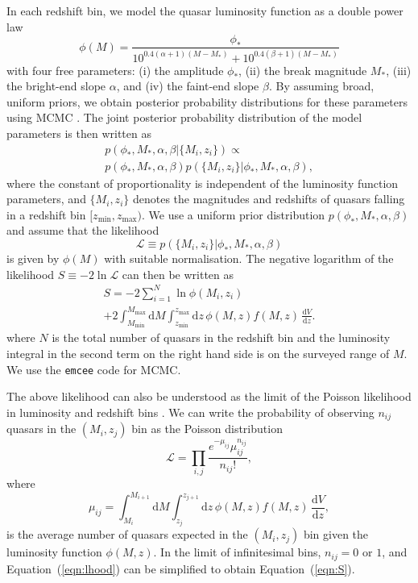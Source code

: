 \documentclass[fleqn,usenatbib]{mnras}
\begin{document}
In each redshift bin, we model the quasar
luminosity function as a double power law 
\citep[e.g.][]{1988MNRAS.235..935B}
\begin{equation}
  \phi(M) =
  \frac{\phi_*}{10^{0.4(\alpha+1)(M-M_*)}+10^{0.4(\beta+1)(M-M_*)}}
  \label{eqn:dpl}
\end{equation}
with four free parameters: (i) the amplitude $\phi_*$, (ii) the break magnitude $M_*$,
(iii)  the bright-end slope $\alpha$, and (iv) the faint-end slope $\beta$.
By assuming broad, uniform priors, we
obtain posterior probability distributions for these parameters using
MCMC \citep[e.g.,][]{jaynes}.  The joint posterior probability
distribution of the model parameters is then written as
\begin{multline}
  p(\phi_*, M_*, \alpha, \beta | \{M_i, z_i\}) \propto \\ p(\phi_*, M_*,
  \alpha, \beta)p(\{M_i, z_i\} | \phi_*, M_*, \alpha, \beta),
\end{multline}
where the constant of proportionality is independent of the luminosity
function parameters, and $\{M_i, z_i\}$ denotes the magnitudes and
redshifts of quasars falling in a redshift bin $[z_\mathrm{min},
z_\mathrm{max})$.  We use a uniform prior distribution $p(\phi_*,
M_*, \alpha, \beta)$ and assume that the likelihood
\begin{equation}
  \mathcal{L}\equiv p(\{M_i, z_i\} | \phi_*, M_*, \alpha, \beta)
\end{equation}
is given by $\phi(M)$ with suitable normalisation.  The negative
logarithm of the likelihood $S\equiv -2\ln\mathcal{L}$ can then be
written as
\begin{multline}
  S = -2\sum_{i=1}^N\ln\phi(M_i, z_i)\\+2\int_{M_\mathrm{min}}^{M_\mathrm{max}}\mathrm{d}M
  \int_{z_\mathrm{min}}^{z_\mathrm{max}}\mathrm{d}z\, \phi(M,z) f(M, z)\,\frac{\mathrm{d}V}{\mathrm{d}z}.
  \label{eqn:S}
\end{multline}
where $N$ is the total number of quasars in the redshift bin and the
luminosity integral in the second term on the right hand side is on
the surveyed range of $M$.  We use the \texttt{emcee} code
\citep{2013PASP..125..306F} for MCMC.

The above likelihood can also be understood as the limit of the
Poisson likelihood in luminosity and redshift bins
\citep{1983ApJ...269...35M, 2001AJ....121...54F}.  We can write the
probability of observing $n_{ij}$ quasars in the $(M_i, z_j)$ bin as
the Poisson distribution
\begin{equation}
  \mathcal{L}=\prod_{i,j}\frac{e^{-\mu_{ij}}\mu_{ij}^{n_{ij}}}{n_{ij}!},
  \label{eqn:lhood}
\end{equation}
where 
\begin{equation}
  \mu_{ij}= \int_{M_i}^{M_{i+1}}\mathrm{d}M\int_{z_j}^{z_{j+1}}\mathrm{d}z\, \phi(M,z) f(M, z)
  \,\frac{\mathrm{d}V}{\mathrm{d}z},
\end{equation}
is the average number of quasars expected in the $(M_i, z_j)$ bin
given the luminosity function $\phi(M,z)$.  In the limit of
infinitesimal bins, $n_{ij}=0$ or $1$, and Equation~(\ref{eqn:lhood})
can be simplified to obtain Equation~(\ref{eqn:S}).
\end{document}
